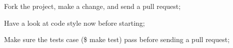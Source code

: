
\begin{DoxyItemize}
\item Fork the project, make a change, and send a pull request;
\item Have a look at code style now before starting;
\item Make sure the tests case ({\ttfamily \$ make test}) pass before sending a pull request; 
\end{DoxyItemize}
